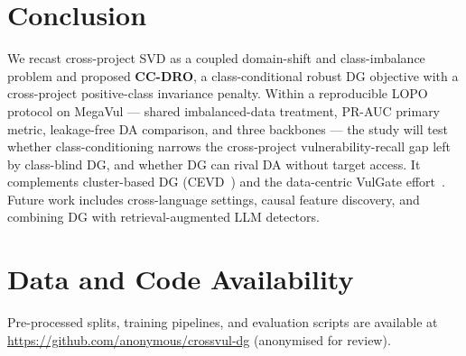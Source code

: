 \documentclass[conference]{IEEEtran}
\begin{document}
\section{Conclusion}
We recast cross-project SVD as a coupled domain-shift and
class-imbalance problem and proposed \textbf{CC-DRO}, a
class-conditional robust DG objective with a cross-project
positive-class invariance penalty. Within a reproducible LOPO
protocol on MegaVul --- shared imbalanced-data treatment, PR-AUC
primary metric, leakage-free DA comparison, and three backbones ---
the study will test whether class-conditioning narrows the
cross-project vulnerability-recall gap left by class-blind DG, and
whether DG can rival DA without target access. It complements
cluster-based DG (CEVD~\cite{cevd}) and the data-centric VulGate
effort~\cite{vulgate}. Future work includes cross-language
settings, causal feature discovery, and combining DG with
retrieval-augmented LLM detectors.

\section*{Data and Code Availability}
Pre-processed splits, training pipelines, and evaluation scripts
are available at \url{https://github.com/anonymous/crossvul-dg}
(anonymised for review).
\end{document}
